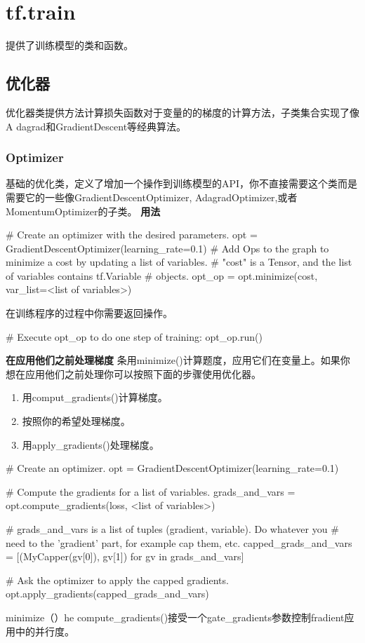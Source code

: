 \section{tf.train}
提供了训练模型的类和函数。
\subsection{优化器}
优化器类提供方法计算损失函数对于变量的的梯度的计算方法，子类集合实现了像A
dagrad和GradientDescent等经典算法。
\subsubsection{Optimizer}
基础的优化类，定义了增加一个操作到训练模型的API，你不直接需要这个类而是需要它的一些像GradientDescentOptimizer, AdagradOptimizer,或者MomentumOptimizer的子类。
\textbf{用法}\newline
\begin{python}
# Create an optimizer with the desired parameters.
opt = GradientDescentOptimizer(learning_rate=0.1)
# Add Ops to the graph to minimize a cost by updating a list of variables.
# "cost" is a Tensor, and the list of variables contains tf.Variable
# objects.
opt_op = opt.minimize(cost, var_list=<list of variables>)
\end{python}
在训练程序的过程中你需要返回操作。
\begin{python}
# Execute opt_op to do one step of training:
opt_op.run()
\end{python}
\textbf{在应用他们之前处理梯度}\newline
条用minimize()计算题度，应用它们在变量上。如果你想在应用他们之前处理你可以按照下面的步骤使用优化器。
\begin{enumerate}
	\item 用comput\_gradients()计算梯度。
	\item 按照你的希望处理梯度。
	\item 用apply\_gradients()处理梯度。
\end{enumerate}
\begin{python}
# Create an optimizer.
opt = GradientDescentOptimizer(learning_rate=0.1)

# Compute the gradients for a list of variables.
grads_and_vars = opt.compute_gradients(loss, <list of variables>)

# grads_and_vars is a list of tuples (gradient, variable).  Do whatever you
# need to the 'gradient' part, for example cap them, etc.
capped_grads_and_vars = [(MyCapper(gv[0]), gv[1]) for gv in grads_and_vars]

# Ask the optimizer to apply the capped gradients.
opt.apply_gradients(capped_grads_and_vars)
\end{python}
minimize（）he compute\_gradients()接受一个gate\_gradients参数控制fradient应用中的并行度。

